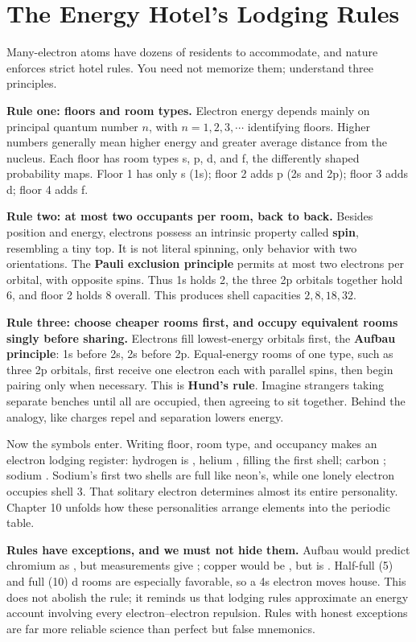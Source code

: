 \section{The Energy Hotel's Lodging Rules}

Many-electron atoms have dozens of residents to accommodate, and nature enforces strict hotel rules. You need not memorize them; understand three principles.

\textbf{Rule one: floors and room types.} Electron energy depends mainly on principal quantum number $n$, with $n=1,2,3,\cdots$ identifying floors. Higher numbers generally mean higher energy and greater average distance from the nucleus. Each floor has room types s, p, d, and f, the differently shaped probability maps. Floor 1 has only s (1s); floor 2 adds p (2s and 2p); floor 3 adds d; floor 4 adds f.

\textbf{Rule two: at most two occupants per room, back to back.} Besides position and energy, electrons possess an intrinsic property called \textbf{spin}, resembling a tiny top. It is not literal spinning, only behavior with two orientations. The \textbf{Pauli exclusion principle} permits at most two electrons per orbital, with opposite spins. Thus 1s holds 2, the three 2p orbitals together hold 6, and floor 2 holds 8 overall. This produces shell capacities $2,8,18,32$.

\textbf{Rule three: choose cheaper rooms first, and occupy equivalent rooms singly before sharing.} Electrons fill lowest-energy orbitals first, the \textbf{Aufbau principle}: 1s before 2s, 2s before 2p. Equal-energy rooms of one type, such as three 2p orbitals, first receive one electron each with parallel spins, then begin pairing only when necessary. This is \textbf{Hund's rule}. Imagine strangers taking separate benches until all are occupied, then agreeing to sit together. Behind the analogy, like charges repel and separation lowers energy.

Now the symbols enter. Writing floor, room type, and occupancy makes an electron lodging register: hydrogen is , helium , filling the first shell; carbon ; sodium . Sodium's first two shells are full like neon's, while one lonely electron occupies shell 3. That solitary electron determines almost its entire personality. Chapter 10 unfolds how these personalities arrange elements into the periodic table.

\textbf{Rules have exceptions, and we must not hide them.} Aufbau would predict chromium as , but measurements give ; copper would be , but is . Half-full (5) and full (10) d rooms are especially favorable, so a 4s electron moves house. This does not abolish the rule; it reminds us that lodging rules approximate an energy account involving every electron--electron repulsion. Rules with honest exceptions are far more reliable science than perfect but false mnemonics.


